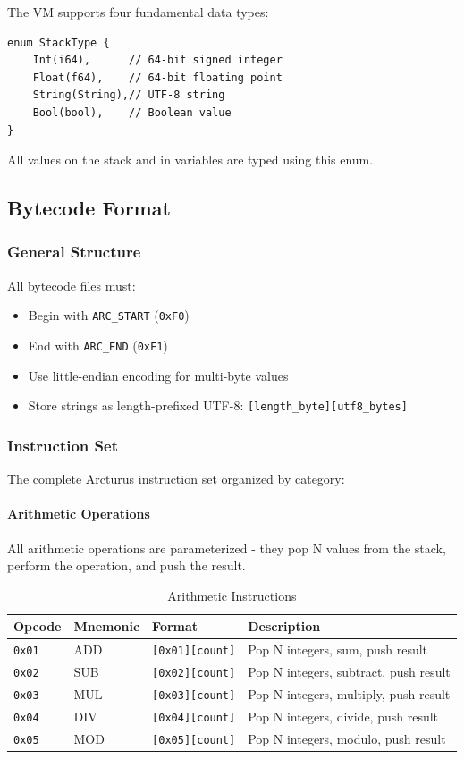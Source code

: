 \documentclass[11pt,a4paper]{article}
\begin{document}
The VM supports four fundamental data types:

\begin{lstlisting}[style=rustcode]
enum StackType {
    Int(i64),      // 64-bit signed integer
    Float(f64),    // 64-bit floating point
    String(String),// UTF-8 string
    Bool(bool),    // Boolean value
}
\end{lstlisting}

All values on the stack and in variables are typed using this enum.

\subsection{Bytecode Format}

\subsubsection{General Structure}

All bytecode files must:
\begin{itemize}
    \item Begin with \texttt{ARC\_START} (\texttt{0xF0})
    \item End with \texttt{ARC\_END} (\texttt{0xF1})
    \item Use little-endian encoding for multi-byte values
    \item Store strings as length-prefixed UTF-8: \texttt{[length\_byte][utf8\_bytes]}
\end{itemize}

\subsubsection{Instruction Set}

The complete Arcturus instruction set organized by category:

\paragraph{Arithmetic Operations}
All arithmetic operations are parameterized - they pop N values from the stack, perform the operation, and push the result.

\begin{table}[h]
\centering
\begin{tabular}{@{}llll@{}}
\toprule
Opcode & Mnemonic & Format & Description \\
\midrule
\texttt{0x01} & ADD & \texttt{[0x01][count]} & Pop N integers, sum, push result \\
\texttt{0x02} & SUB & \texttt{[0x02][count]} & Pop N integers, subtract, push result \\
\texttt{0x03} & MUL & \texttt{[0x03][count]} & Pop N integers, multiply, push result \\
\texttt{0x04} & DIV & \texttt{[0x04][count]} & Pop N integers, divide, push result \\
\texttt{0x05} & MOD & \texttt{[0x05][count]} & Pop N integers, modulo, push result \\
\bottomrule
\end{tabular}
\caption{Arithmetic Instructions}
\end{table}
\end{document}
